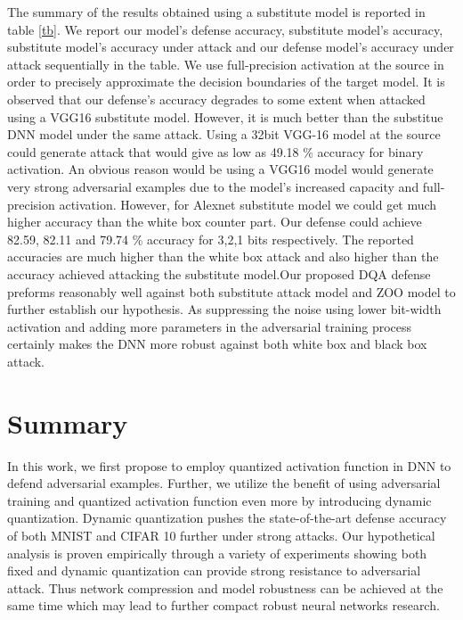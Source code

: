 \documentclass{article}
\begin{document}
The summary of the results obtained using a substitute model is reported in table \ref{tb}. We report our model's defense accuracy, substitute model's accuracy, substitute model's accuracy under attack and our defense model's accuracy under attack sequentially in the table. We use full-precision activation at the source in order to precisely approximate the decision boundaries of the target model. It is observed that our defense's accuracy degrades to some extent when attacked using a VGG16 substitute model. However, it is much better than the substitue DNN model under the same attack. Using a 32bit VGG-16 model at the source could generate attack that would give as low as 49.18 \% accuracy for binary activation. An obvious reason would be using a VGG16 model would generate very strong adversarial examples due to the model's increased capacity and full- precision activation. However, for Alexnet substitute model we could get much higher accuracy than the white box counter part. Our defense could achieve 82.59, 82.11 and 79.74 \% accuracy for 3,2,1 bits respectively. The reported accuracies are much higher than the white box attack and also higher than the accuracy achieved attacking the substitute model.Our proposed DQA defense preforms reasonably well against both substitute attack model and ZOO model to further establish our hypothesis. As suppressing the noise using lower bit-width activation and adding more parameters in the adversarial training process certainly makes the DNN more robust against both white box and black box attack.





\section{Summary}
In this work, we first propose to employ quantized activation function in DNN to defend adversarial examples. Further, we utilize the benefit of using adversarial training and quantized activation function even more by introducing dynamic quantization. Dynamic quantization pushes the state-of-the-art defense accuracy of both MNIST and CIFAR 10 further under strong attacks. Our hypothetical analysis is proven empirically through a variety of experiments showing both fixed and dynamic quantization can provide strong resistance to adversarial attack. Thus network compression and model robustness can be achieved at the same time which may lead to further compact robust neural networks research.



\end{document}
